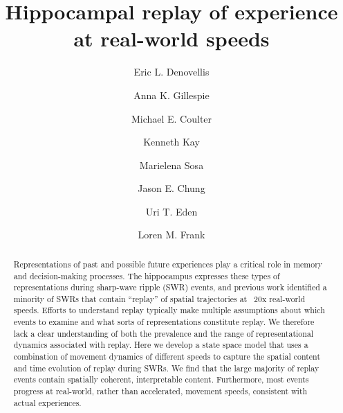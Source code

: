\documentclass[times, twoside]{zHenriquesLab-StyleBioRxiv}
\begin{document}
\title{Hippocampal replay of experience at real-world speeds}

\author[1]{Eric L. Denovellis}
\author[2, 3]{Anna K. Gillespie}
\author[2, 3]{Michael E. Coulter}
\author[4]{Kenneth Kay}
\author[5]{Marielena Sosa}
\author[6]{Jason E. Chung}
\author[7]{Uri T. Eden}
\author[1, 2, 3, \Letter]{Loren M. Frank}




\maketitle

\begin{abstract}
Representations of past and possible future experiences play a critical role in memory and decision-making processes. The hippocampus expresses these types of representations during sharp-wave ripple (SWR) events, and previous work identified a minority of SWRs that contain “replay” of spatial trajectories at ~20x real-world speeds. Efforts to understand replay typically make multiple assumptions about which events to examine and what sorts of representations constitute replay. We therefore lack a clear understanding of both the prevalence and the range of representational dynamics associated with replay. Here we develop a state space model that uses a combination of movement dynamics of different speeds to capture the spatial content and time evolution of replay during SWRs. We find that the large majority of replay events contain spatially coherent, interpretable content. Furthermore, most events progress at real-world, rather than accelerated, movement speeds, consistent with actual experiences. 
\end {abstract}
\end{document}

